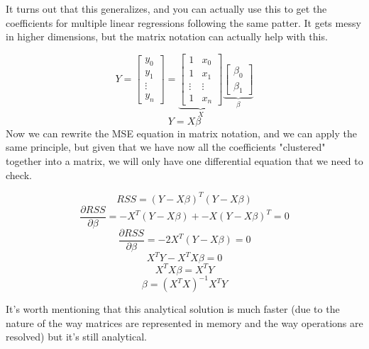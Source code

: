 \documentclass[12pt,a4paper]{article}
\begin{document}
It turns out that this generalizes, and you can actually use this to get the coefficients for multiple linear regressions following the same patter. It gets messy in higher dimensions, but the matrix notation can actually help with this.

\begin{equation*}
    Y = 
    \begin{bmatrix}
    y_{0} \\ y_{1} \\ \vdots \\ y_{n}
    \end{bmatrix} = 
    \underbrace{
    \begin{bmatrix}
        1 & x_{0} \\ 1 & x_{1} \\ \vdots & \vdots \\ 1 & x_{n}
    \end{bmatrix}
    }_{X}
    \underbrace{
    \begin{bmatrix}
        \beta_{0} \\ \beta_{1}
    \end{bmatrix}}_{\beta}
\end{equation*}
$$ Y = X\beta $$
Now we can rewrite the MSE equation in matrix notation, and we can apply the same principle, but given that we have now all the coefficients "clustered" together into a matrix, we will only have one differential equation that we need to check.

$$RSS = (Y - X\beta)^{T}(Y - X\beta)$$
$$\frac{\partial{RSS}}{\partial{\beta}} = -X^{T}(Y-X\beta) + -X(Y-X\beta)^{T} = 0$$
$$\frac{\partial{RSS}}{\partial{\beta}} = -2X^{T}(Y-X\beta)= 0$$
$$X^{T}Y - X^{T}X\beta = 0$$
$$X^{T}X\beta = X^{T}Y$$
$$\beta = (X^{T}X)^{-1}X^{T}Y$$

It's worth mentioning that this analytical solution is much faster (due to the nature of the way matrices are represented in memory and the way operations are resolved) but it's still analytical.
\maketitle
\end{document}
